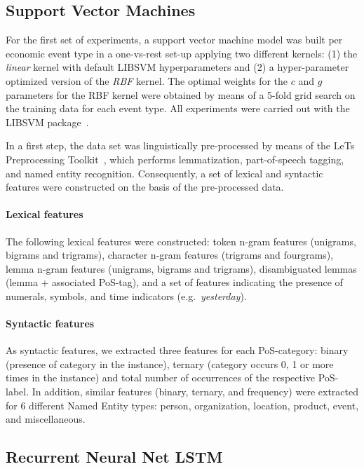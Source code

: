 \documentclass[11pt,a4paper]{article}
\begin{document}
\subsection{Support Vector Machines} \label{subsec:svm}

For the first set of experiments, a support vector machine model was built per economic event type in a one-vs-rest set-up applying two different kernels:
(1) the \emph{linear} kernel with default LIBSVM hyperparameters and (2) a hyper-parameter optimized version of the \emph{RBF} kernel. 
The optimal weights for the $c$ and $g$ parameters for the RBF kernel were obtained by means of a 5-fold grid search on the training data for each event type. All experiments were carried out with the LIBSVM package~\cite{Chang2011}.

In a first step, the data set was linguistically pre-processed by means of the LeTs Preprocessing Toolkit~\cite{VandeKauter2013}, which performs lemmatization, part-of-speech tagging, and named entity recognition.
Consequently, a set of lexical and syntactic features were constructed on the basis of the pre-processed data. 
\paragraph{Lexical features} 
The following lexical features were constructed: token n-gram features (unigrams, bigrams and trigrams), character n-gram features (trigrams and fourgrams), lemma n-gram features (unigrams, bigrams and trigrams), disambiguated lemmas (lemma + associated PoS-tag), and a set of features indicating the presence of numerals, symbols, and time indicators (e.g.~\emph{yesterday}).

\paragraph{Syntactic features}
As syntactic features, we extracted three features for each PoS-category: binary (presence of category in the instance), ternary (category occurs 0, 1 or more times in the instance) and total number of occurrences of the respective PoS-label.
In addition, similar features (binary, ternary, and frequency) were extracted for 6 different Named Entity types: person, organization, location, product, event, and miscellaneous.

\subsection{Recurrent Neural Net LSTM}
\end{document}
